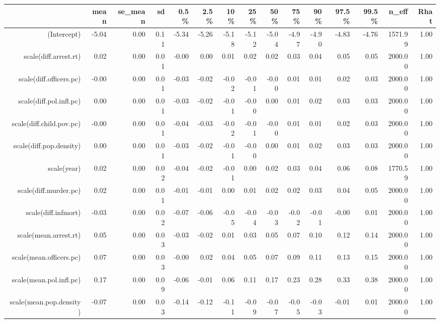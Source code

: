\begin{table}[ht]
\centering
\begin{tabular}{rrrrrrrrrrrrrrr}
  \hline
 & mean & se\_mean & sd & 0.5\% & 2.5\% & 10\% & 25\% & 50\% & 75\% & 90\% & 97.5\% & 99.5\% & n\_eff & Rhat \\ 
  \hline
(Intercept) & -5.04 & 0.00 & 0.11 & -5.34 & -5.26 & -5.18 & -5.12 & -5.04 & -4.97 & -4.90 & -4.83 & -4.76 & 1571.99 & 1.00 \\ 
  scale(diff.arrest.rt) & 0.02 & 0.00 & 0.01 & -0.00 & 0.00 & 0.01 & 0.02 & 0.02 & 0.03 & 0.04 & 0.05 & 0.05 & 2000.00 & 1.00 \\ 
  scale(diff.officers.pc) & -0.00 & 0.00 & 0.01 & -0.03 & -0.02 & -0.02 & -0.01 & -0.00 & 0.01 & 0.01 & 0.02 & 0.03 & 2000.00 & 1.00 \\ 
  scale(diff.pol.infl.pc) & 0.00 & 0.00 & 0.01 & -0.03 & -0.02 & -0.01 & -0.00 & 0.00 & 0.01 & 0.02 & 0.03 & 0.03 & 2000.00 & 1.00 \\ 
  scale(diff.child.pov.pc) & -0.00 & 0.00 & 0.01 & -0.04 & -0.03 & -0.02 & -0.01 & -0.00 & 0.01 & 0.01 & 0.02 & 0.03 & 2000.00 & 1.00 \\ 
  scale(diff.pop.density) & 0.00 & 0.00 & 0.01 & -0.03 & -0.02 & -0.01 & -0.00 & 0.00 & 0.01 & 0.02 & 0.03 & 0.03 & 2000.00 & 1.00 \\ 
  scale(year) & 0.02 & 0.00 & 0.02 & -0.04 & -0.02 & -0.01 & 0.00 & 0.02 & 0.03 & 0.04 & 0.06 & 0.08 & 1770.59 & 1.00 \\ 
  scale(diff.murder.pc) & 0.02 & 0.00 & 0.01 & -0.01 & -0.01 & 0.00 & 0.01 & 0.02 & 0.02 & 0.03 & 0.04 & 0.05 & 2000.00 & 1.00 \\ 
  scale(diff.infmort) & -0.03 & 0.00 & 0.02 & -0.07 & -0.06 & -0.05 & -0.04 & -0.03 & -0.02 & -0.01 & -0.00 & 0.01 & 2000.00 & 1.00 \\ 
  scale(mean.arrest.rt) & 0.05 & 0.00 & 0.03 & -0.03 & -0.02 & 0.01 & 0.03 & 0.05 & 0.07 & 0.10 & 0.12 & 0.14 & 2000.00 & 1.00 \\ 
  scale(mean.officers.pc) & 0.07 & 0.00 & 0.03 & -0.00 & 0.02 & 0.04 & 0.05 & 0.07 & 0.09 & 0.11 & 0.13 & 0.15 & 2000.00 & 1.00 \\ 
  scale(mean.pol.infl.pc) & 0.17 & 0.00 & 0.09 & -0.06 & -0.01 & 0.06 & 0.11 & 0.17 & 0.23 & 0.28 & 0.33 & 0.38 & 2000.00 & 1.00 \\ 
  scale(mean.pop.density) & -0.07 & 0.00 & 0.03 & -0.14 & -0.12 & -0.11 & -0.09 & -0.07 & -0.05 & -0.03 & -0.01 & 0.01 & 2000.00 & 1.00 \\ 

\end{tabular}
\end{table}
